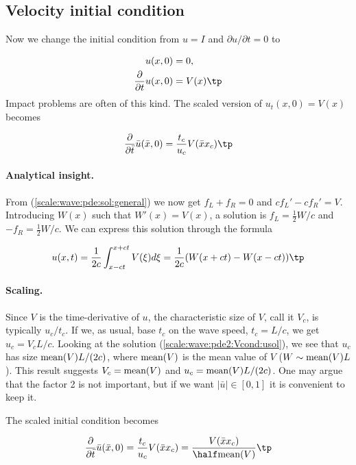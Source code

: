 \documentclass[graybox,envcountchap,sectrefs,final]{svmonodo}
\begin{document}
\subsection{Velocity initial condition}
\label{scale:wave:pde2:Vcond}

Now we change the initial condition from $u=I$ and $\partial u/\partial t = 0$ to

\begin{align}
u(x,0) &= 0,\\ 
\frac{\partial}{\partial t} u(x,0) &= V(x)\tp
\end{align}
Impact problems are often of this kind.
The scaled version of $u_t(x,0)=V(x)$ becomes

\[ \frac{\partial}{\partial \bar t} \bar u(\bar x,0) =
\frac{t_c}{u_c}V(\bar x x_c)\tp
\]

\paragraph{Analytical insight.}
From (\ref{scale:wave:pde:sol:general}) we now get $f_L + f_R =0$ and
$cf_L' - cf_R' = V$. Introducing $W(x)$ such that $W'(x)=V(x)$, a solution
is $f_L=\frac{1}{2}W/c$ and $-f_R=\frac{1}{2}W/c$. We can express this
solution through the formula

\begin{equation}
u(x,t) = \frac{1}{2c}\int_{x-ct}^{x+ct} V(\xi) d\xi
 = \frac{1}{2c}(W(x+ct) - W(x-ct))\tp
 \label{scale:wave:pde2:Vcond:usol}
 \end{equation}

\paragraph{Scaling.}
Since $V$ is the time-derivative of $u$, the characteristic size of
$V$, call it $V_c$, is typically $u_c/t_c$.  If we, as usual, base
$t_c$ on the wave speed, $t_c = L/c$, we get $u_c = V_cL/c$.  Looking
at the solution (\ref{scale:wave:pde2:Vcond:usol}), we see that $u_c$
has size $\hbox{mean}(V)L/(2c)$, where $\hbox{mean}(V)$ is the mean
value of $V$ ($W\sim\hbox{mean}(V)L$). This result suggests
$V_c=\hbox{mean}(V)$ and $u_c = \hbox{mean}(V)L/(2c)$. One may argue
that the factor 2 is not important, but if we want $|\bar u|\in [0,1]$
it is convenient to keep it.

The scaled initial condition becomes

\[ \frac{\partial}{\partial \bar t} \bar u(\bar x,0) =
\frac{t_c}{u_c}V(\bar x x_c) =
\frac{V(\bar x x_c)}{\half\hbox{mean}(V)}\tp
\]
\end{document}
